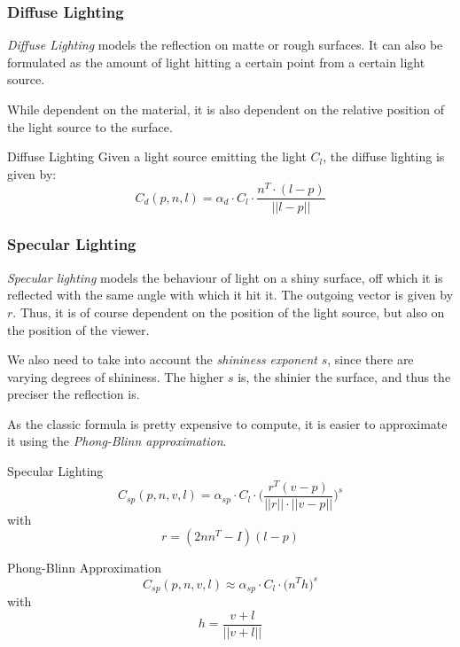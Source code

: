 \documentclass[english]{panikzettel}
\begin{document}
\subsubsection*{Diffuse Lighting}


\begin{halfboxl}
\vspace{-\baselineskip}
\textit{Diffuse Lighting} models the reflection on matte or rough surfaces. It can also be formulated as the amount of light hitting a certain point from a certain light source.

While dependent on the material, it is also dependent on the relative position of the light source to the surface.
\end{halfboxl}%
\begin{halfboxr}
\vspace{-\baselineskip}
\begin{defi}{Diffuse Lighting}
Given a light source emitting the light $C_l$, the diffuse lighting is given by:
$$C_d(p,n,l) = \alpha_d \cdot C_l \cdot \frac{n^T \cdot (l-p)}{||l-p||}$$
\end{defi}
\end{halfboxr}

\subsubsection*{Specular Lighting}

\begin{halfboxl}
\textit{Specular lighting} models the behaviour of light on a shiny surface, off which it is reflected with the same angle with which it hit it. The outgoing vector is given by $r$. Thus, it is of course dependent on the position of the light source, but also on the position of the viewer.

We also need to take into account the \emph{shininess exponent} $s$, since there are varying degrees of shininess. The higher $s$ is, the shinier the surface, and thus the preciser the reflection is.

As the classic formula is pretty expensive to compute, it is easier to approximate it using the \emph{Phong-Blinn approximation}.
\end{halfboxl}%
\begin{halfboxr}
\vspace{-\baselineskip}
\begin{defi}{Specular Lighting}
$$C_{sp} (p,n,v,l) = \alpha_{sp} \cdot C_l \cdot \bigg(\frac{r^T(v-p)}{||r||\cdot||v-p||}\bigg)^s$$ with $$r = (2nn^T-I)(l-p)$$
\end{defi}

\begin{defi}{Phong-Blinn Approximation}
$$C_{sp}(p,n,v,l) \approx \alpha_{sp}  \cdot C_l \cdot \big(n^Th\big)^s$$ with $$h= \frac{v + l}{||v + l||}$$
\end{defi}
\end{halfboxr}
\end{document}
